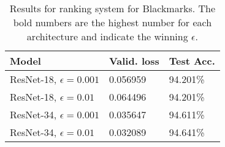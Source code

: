 \begin{table}
\small
    \centering
    \caption{Results for ranking system for Blackmarks. The bold numbers are the highest number for each architecture and indicate the winning $\epsilon$.}
    \label{tab:blackmarks-ranking-fidelity-resnet18/34}
    \begin{tabular}{|l|l|l|}
        \hline
        \textbf{Model} & Valid. loss & Test Acc. \\
        \hline
        ResNet-18, $\epsilon=0.001$ &  0.056959   &  94.201\%     \\
        \hline 
        ResNet-18, $\epsilon=0.01$  &  0.064496   &   94.201\%    \\
        \hline 
        ResNet-34, $\epsilon=0.001$ & 0.035647    &   94.611\%   \\
        \hline 
        ResNet-34, $\epsilon=0.01$  & 0.032089    &  94.641\%     \\
        \hline 
    \end{tabular}
\end{table}